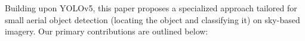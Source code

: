 \documentclass[preprint,review,12pt]{elsarticle}
\begin{document}
Building upon YOLOv5, this paper proposes a specialized approach tailored for small aerial object detection (locating the object and classifying it) on sky-based imagery. Our primary contributions are outlined below:
\end{document}
